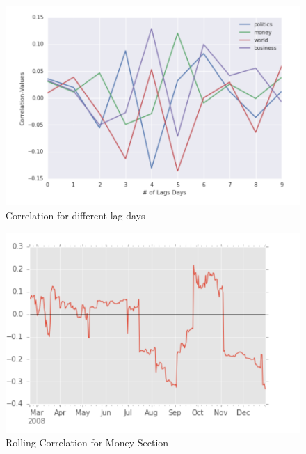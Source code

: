 \documentclass{acm_proc_article-sp}
\begin{document}
\begin{figure}[h]
\includegraphics[width=\linewidth]{figures/lag_corr.png}
\caption{Correlation for different lag days}
\label{fig:corrlag}
\end{figure}

\begin{figure}[h]
\includegraphics[width=\linewidth]{figures/rolling_corr_money.png}
\caption{Rolling Correlation for Money Section}
\label{fig:rolmoney}
\end{figure}
\end{document}
